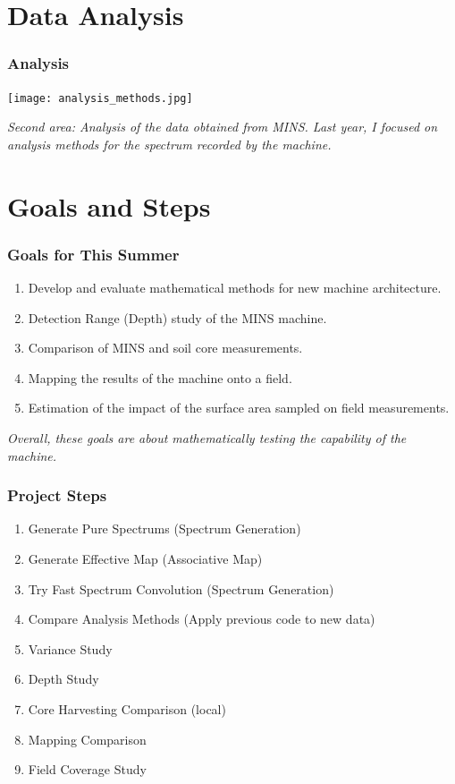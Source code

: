 \documentclass[notheorems,11pt,compress]{beamer}
\begin{document}
\section{Data Analysis}

\begin{frame}
\frametitle{Analysis}
\begin{center}
\texttt{[image: analysis\_methods.jpg]}
\end{center}
\small
\textit{Second area: Analysis of the data obtained from MINS. Last year, I focused on analysis methods for the spectrum recorded by the machine.}
\end{frame}

\section{Goals and Steps}

\begin{frame}
\frametitle{Goals for This Summer}
\begin{enumerate}
    \item Develop and evaluate mathematical methods for new machine architecture.
    \item Detection Range (Depth) study of the MINS machine.
    \item Comparison of MINS and soil core measurements.
    \item Mapping the results of the machine onto a field.
    \item Estimation of the impact of the surface area sampled on field measurements.
\end{enumerate}
\small
\textit{Overall, these goals are about mathematically testing the capability of the machine.}
\end{frame}

\begin{frame}
\frametitle{Project Steps}
\begin{enumerate}
    \item Generate Pure Spectrums (Spectrum Generation)
    \item Generate Effective Map (Associative Map)
    \item Try Fast Spectrum Convolution (Spectrum Generation)
    \item Compare Analysis Methods (Apply previous code to new data)
    \item Variance Study
    \item Depth Study
    \item Core Harvesting Comparison (local)
    \item Mapping Comparison
    \item Field Coverage Study
\end{enumerate}
\end{frame}
\end{document}
